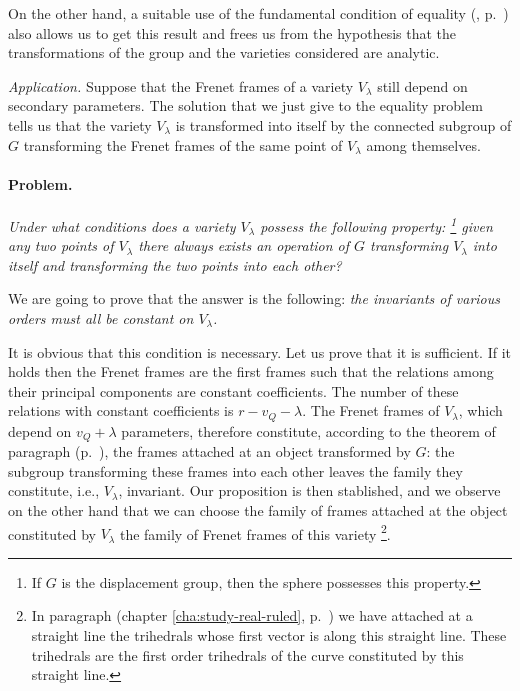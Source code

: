 On the other hand, a suitable use of the fundamental condition of equality (, p.~\pageref{sec:76}) also allows us to get this result and frees us from the hypothesis that the transformations of the group and the varieties considered are analytic.

\somespace

\emph{Application.} Suppose that the Frenet frames of a variety $V_{\lambda}$ still depend on secondary parameters. The solution that we just give to the equality problem tells us that the variety $V_{\lambda}$ is transformed into itself by the connected subgroup of $G$ transforming the Frenet frames of the same point of $V_{\lambda}$ among themselves.


\paragraph{Problem.}
\label{sec:132}
\emph{Under what conditions does a variety $V_{\lambda}$ possess the following property: \footnote{If $G$ is the displacement group, then the sphere possesses this property.} given any two points of $V_{\lambda}$ there always exists an operation of $G$ transforming $V_{\lambda}$ into itself and transforming the two points into each other?}

\somespace

We are going to prove that the answer is the following: \emph{the invariants of various orders must all be constant on $V_{\lambda}$.}

It is obvious that this condition is necessary. Let us prove that it is sufficient. If it holds then the Frenet frames are the first frames such that the relations among their principal components are constant coefficients. The number of these relations with constant coefficients is $r-v_{Q}-\lambda$. The Frenet frames of $V_{\lambda}$, which depend on $v_{Q}+\lambda$ parameters, therefore constitute, according to the theorem of paragraph  (p.~\pageref{sec:124}), the frames attached at an object transformed by $G$: the subgroup transforming these frames into each other leaves the family they constitute, i.e., $V_{\lambda}$, invariant. Our proposition is then stablished, and we observe on the other hand that we can choose the family of frames attached at the object constituted by $V_{\lambda}$ the family of Frenet frames of this variety \footnote{In paragraph  (chapter \ref{cha:study-real-ruled}, p.~\pageref{sec:44}) we have attached at a straight line the trihedrals whose first vector is along this straight line. These trihedrals are the first order trihedrals of the curve constituted by this straight line.}.


